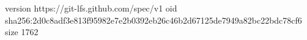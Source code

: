 version https://git-lfs.github.com/spec/v1
oid sha256:2d0c8adf3e813f95982e7e2b0392eb26c46b2d67125de7949a82bc22bdc78cf6
size 1762
